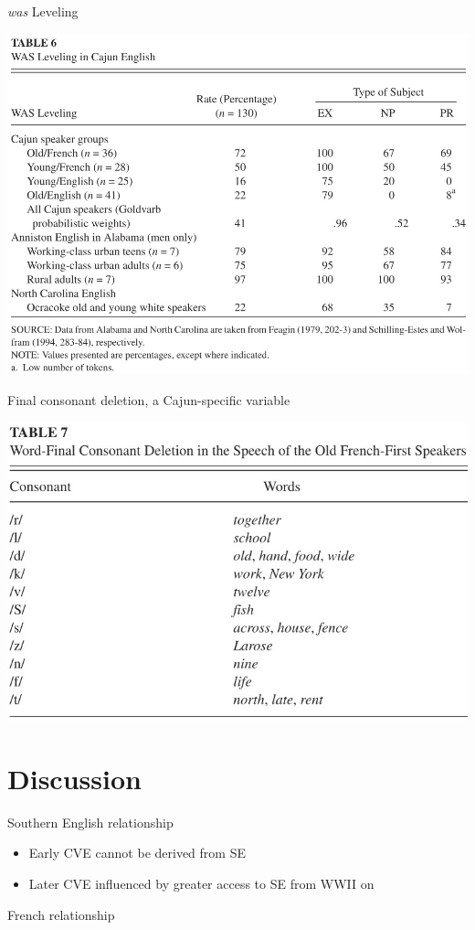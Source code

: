 \documentclass{beamer}
\begin{document}
    \begin{frame}{\emph{was} Leveling}
      \begin{center}
        \includegraphics[scale=0.5]{was_leveling.jpg}
      \end{center}
    \end{frame}

    \begin{frame}{Final consonant deletion, a Cajun-specific variable}
      \begin{center}
        \includegraphics[scale=0.65]{final_deletion.jpg}
      \end{center}
    \end{frame}

  \section{Discussion}
    \begin{frame}{Southern English relationship}
      \begin{block}{}
        \begin{itemize}
          \item Early CVE cannot be derived from SE
          \item Later CVE influenced by greater access to SE from WWII on
        \end{itemize}
      \end{block}
    \end{frame}

    \begin{frame}{French relationship}
    \end{frame}
\end{document}
